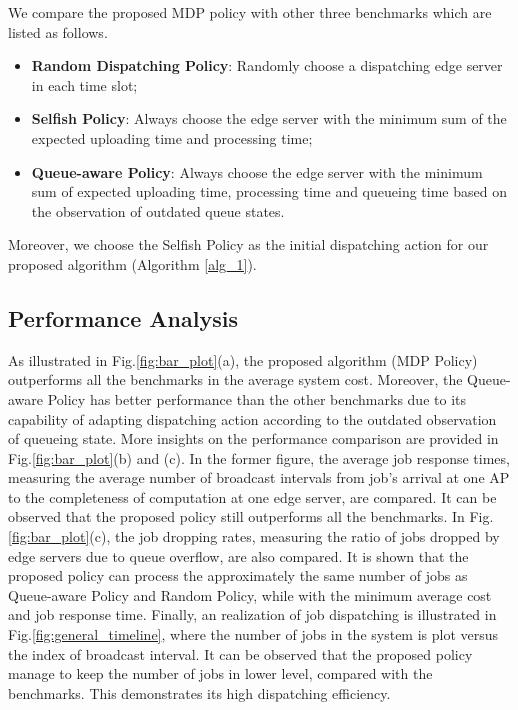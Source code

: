 We compare the proposed MDP policy with other three benchmarks which are listed as follows.
\begin{itemize}
    \item \textbf{Random Dispatching Policy}:
            Randomly choose a dispatching edge server in each time slot; 
    \item \textbf{Selfish Policy}:
            Always choose the edge server with the minimum sum of the expected uploading time and processing time;
    \item \textbf{Queue-aware Policy}:
            Always choose the edge server with the minimum sum of expected uploading time, processing time and queueing time based on the observation of outdated queue states.
\end{itemize}
Moreover, we choose the Selfish Policy as the initial dispatching action for our proposed algorithm (Algorithm \ref{alg_1}).
\subsection{Performance Analysis}
\label{subsec:basic}
As illustrated in Fig.\ref{fig:bar_plot}(a), the proposed algorithm (MDP Policy) outperforms all the benchmarks in the average system cost.
Moreover, the Queue-aware Policy has better performance than the other benchmarks due to its capability of adapting dispatching action according to the outdated observation of queueing state.
More insights on the performance comparison are provided in Fig.\ref{fig:bar_plot}(b) and (c).
In the former figure, the average job response times, measuring the average number of broadcast intervals from job's arrival at one AP to the completeness of computation at one edge server, are compared.
It can be observed that the proposed policy still outperforms all the benchmarks.
In Fig.\ref{fig:bar_plot}(c), the job dropping rates, measuring the ratio of jobs dropped by edge servers due to queue overflow, are also compared.
It is shown that the proposed policy can process the approximately the same number of jobs as Queue-aware Policy and Random Policy, while with the minimum average cost and job response time.
Finally, an realization of job dispatching is illustrated in Fig.\ref{fig:general_timeline}, where the number of jobs in the system is plot versus the index of broadcast interval.
It can be observed that the proposed policy manage to keep the number of jobs in lower level, compared with the benchmarks.
This demonstrates its high dispatching efficiency.

